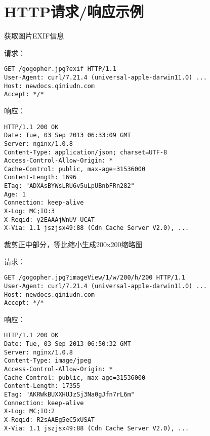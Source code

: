 \documentclass[11pt, oneside]{book}
\newcommand{\qhint}[1]{
\footnotesize
\vspace{0.2em}
\noindent
#1\par
\vspace{-0.5em}
\normalsize
}
\begin{document}
\chapter{HTTP请求/响应示例}

\begin{sample}
  \caption{获取图片EXIF信息}

    \qhint{请求：}
\begin{lstlisting}
GET /gogopher.jpg?exif HTTP/1.1
User-Agent: curl/7.21.4 (universal-apple-darwin11.0) ...
Host: newdocs.qiniudn.com
Accept: */*
\end{lstlisting}

    \qhint{响应：}
\begin{lstlisting}
HTTP/1.1 200 OK
Date: Tue, 03 Sep 2013 06:33:09 GMT
Server: nginx/1.0.8
Content-Type: application/json; charset=UTF-8
Access-Control-Allow-Origin: *
Cache-Control: public, max-age=31536000
Content-Length: 1696
ETag: "ADXAsBYWsLRU6v5uLpUBnbFRn282"
Age: 1
Connection: keep-alive
X-Log: MC;IO:3
X-Reqid: y2EAAAjWnUV-UCAT
X-Via: 1.1 jszjsx49:88 (Cdn Cache Server V2.0), ...
\end{lstlisting}

  \label{exif-http}
\end{sample}

\begin{sample}
  \caption{裁剪正中部分，等比缩小生成200x200缩略图}

    \qhint{请求：}
\begin{lstlisting}
GET /gogopher.jpg?imageView/1/w/200/h/200 HTTP/1.1
User-Agent: curl/7.21.4 (universal-apple-darwin11.0) ...
Host: newdocs.qiniudn.com
Accept: */*
\end{lstlisting}

    \qhint{响应：}
\begin{lstlisting}
HTTP/1.1 200 OK
Date: Tue, 03 Sep 2013 06:50:32 GMT
Server: nginx/1.0.8
Content-Type: image/jpeg
Access-Control-Allow-Origin: *
Cache-Control: public, max-age=31536000
Content-Length: 17355
ETag: "AKRWkBUXXHUJzSj3Na0gJfn7rL6m"
Connection: keep-alive
X-Log: MC;IO:2
X-Reqid: R2sAAEg5eC5xUSAT
X-Via: 1.1 jszjsx49:88 (Cdn Cache Server V2.0), ...
\end{lstlisting}

  \label{imageView-1-200x200-http}
\end{sample}
\end{document}
